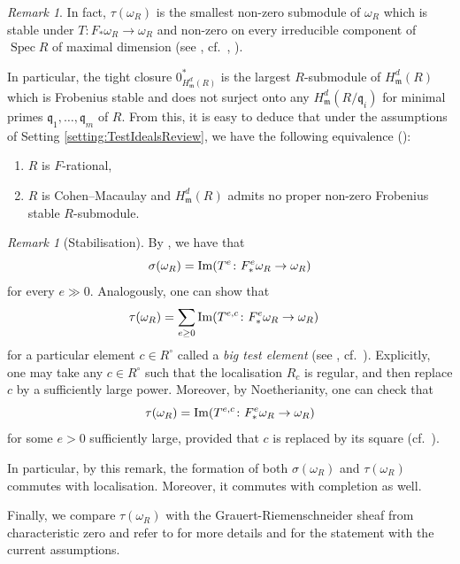\documentclass[letterpaper,11pt]{amsart}
\theoremstyle{plain}
\theoremstyle{definition}
\theoremstyle{remark}
\newtheorem{rmk}[thm]{Remark}
\def\frm{\mathfrak{m}}
\def\m{\mathfrak{m}} %
\DeclareMathOperator{\Spec} {Spec}
\begin{document}
\begin{rmk} \label{rmk:analyticallyIrred}
In fact, $\tau(\omega_R)$ is the smallest non-zero submodule of $\omega_R$ which is stable under $T \colon F_*\omega_R \to \omega_R$ and non-zero on every irreducible component of $\Spec R$ of maximal dimension  (see \cite[Definition 2.33]{bstAlt}, cf.\ \cite{Smith97}, \cite[Definition 2.9(6)]{KTTWYY3}).

In particular, the tight closure $0^*_{H^d_\m(R)}$ is  the largest $R$-submodule of $H^d_\m(R)$ which is Frobenius stable and does not surject onto any $H^d_\m(R/\mathfrak{q}_i)$ for minimal primes $\mathfrak{q}_1, \ldots, \mathfrak{q}_m$ of $R$. From this, it is easy to deduce that  under the assumptions of Setting \ref{setting:TestIdealsReview}, we have the following equivalence (\cite[Theorem 2.6]{Smith97}):
\begin{enumerate}
    \item $R$ is $F$-rational,
    \item $R$ is Cohen--Macaulay and $H^d_\frm(R)$ admits no proper non-zero Frobenius stable $R$-submodule.
\end{enumerate}
\end{rmk}

\begin{rmk}[Stabilisation] \label{rmk:stabilisation}
By \cite[Proposition 2.14]{BB11Finiteness}, we have that \[
\sigma(\omega_R)= {\rm Im}(T^e \colon F^e_*\omega_R \to \omega_R)
\]
for every $e \gg 0$.  Analogously, one can show that
\begin{align*}\tau(\omega_R) &=  \sum_{e \geq 0} {\rm Im}(T^{e,c} \colon F^e_*\omega_R \to \omega_R)
\end{align*}
for a particular element $c \in R^\circ$ called a \emph{big test element} (see \cite[Lemma 4.3]{bstAlt}, cf.\ \cite[Definition 2.9]{KTTWYY3}). Explicitly, one may take any $c \in R^\circ$ such that the localisation $R_c$ is regular, and then replace $c$ by a sufficiently large power. Moreover, by Noetherianity, one can check that
\[
\tau(\omega_R) = {\rm Im}(T^{e,c} \colon F^e_*\omega_R \to \omega_R)
\]
for some $e>0$ sufficiently large, provided that $c$ is replaced by its square (cf.\ \cite[Definition 2.9(7)]{KTTWYY3}).

In particular, by this remark, the formation of both $\sigma(\omega_R)$ and $\tau(\omega_R)$ commutes with localisation. Moreover, it commutes with completion as well.
\end{rmk}

Finally, we compare $\tau(\omega_R)$ with the Grauert-Riemenschneider sheaf from characteristic zero  and refer to \cite{SchwedeSmith_FrobeniusSingularities} for more details and \cite[Proposition 2.12]{epstein2026closureoperationsinducedresolutions} for the statement with the current assumptions.
\end{document}
